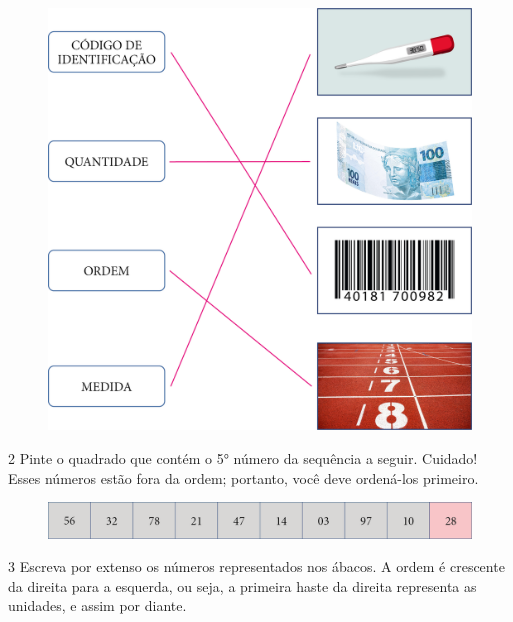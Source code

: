 
\begin{figure}[htpb!]
\centering
\includegraphics[width=.8\textwidth]{./media/image3.png}
\end{figure}


\num{2} Pinte o quadrado que contém o 5° número da sequência a seguir.
Cuidado! Esses números estão fora da ordem; portanto, você deve
ordená-los primeiro.

\begin{figure}[htpb!]
\includegraphics[width=\textwidth]{./media/image4.png}
\end{figure}

\pagebreak
\num{3} Escreva por extenso os números representados nos ábacos. A ordem
é crescente da direita para a esquerda, ou seja, a primeira haste da
direita representa as unidades, e assim por diante.

